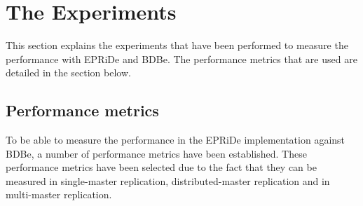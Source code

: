 \section{The Experiments} %
\label{sec:experiments}

This section explains the experiments that have been performed to measure the performance with EPRiDe and BDBe. The performance metrics that are used are detailed in the section below.

\subsection{Performance metrics} %
\label{sub:experiments_performance_metrics}

To be able to measure the performance in the EPRiDe implementation against BDBe, a number of performance metrics have been established. These performance metrics have been selected due to the fact that they can be measured in single-master replication, distributed-master replication and in multi-master replication.



